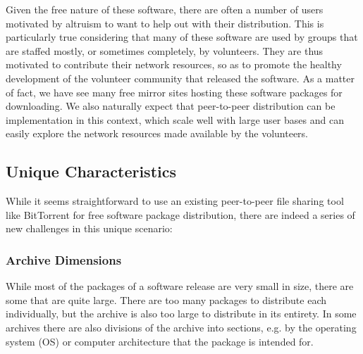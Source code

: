 \documentclass[conference]{IEEEtran}
\begin{document}
Given the free nature of these software, there are often a number of users 
motivated by altruism to want to help out with their distribution. 
This is particularly true considering that many of these software are used by
groups that are staffed mostly, or sometimes completely, by
volunteers. They are thus motivated to contribute their network resources, so as to promote the healthy development 
of the volunteer community that released the software. As a matter of fact,
we have see many free mirror sites hosting these software packages for downloading. 
We also naturally expect that peer-to-peer distribution can be implementation in 
this context, which scale well with large user bases and can easily explore the network resources made available by
the volunteers. 



\subsection{Unique Characteristics}
\label{problems}

While it seems straightforward to use an existing peer-to-peer file sharing tool like BitTorrent for
free software package distribution, there are indeed a series of new challenges in this unique scenario:

\subsubsection{Archive Dimensions}

While most of the packages of a software release are very small in
size, there are some that are quite large. There are too many
packages to distribute each individually, but the archive is also
too large to distribute in its entirety. In some archives there are
also divisions of the archive into sections, e.g. by the operating system (OS) or computer
architecture that the package is intended for.
\end{document}
